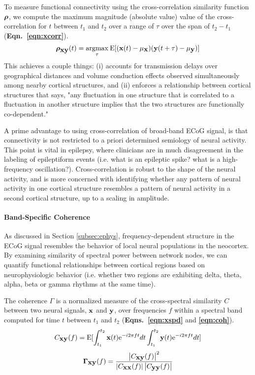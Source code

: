 To measure functional connectivity using the cross-correlation similarity function $\boldsymbol{\displaystyle \rho}$, we compute the maximum magnitude (absolute value) value of the cross-correlation for $t$ between $t_1$ and $t_2$ over a range of $\tau$ over the span of $t_2-t_1$ (\textbf{Eqn.~\ref{eqn:xcorr}}). 
\begin{eqnarray}
    \boldsymbol{\displaystyle \rho}_{\mathbf{\displaystyle xy}}(t) = \underset{\tau}{\operatorname{argmax}}\:{\mathrm{E}}[(\mathbf{\displaystyle x}(t) - \mu_{\mathbf{\displaystyle x}})(\mathbf{\displaystyle y}(t+\tau) - \mu_{\mathbf{\displaystyle y}})]
    \label{eqn:xcorr}
\end{eqnarray}
This achieves a couple things: (i) accounts for transmission delays over geographical distances and volume conduction effects observed simultaneously among nearby cortical structures, and (ii) enforces a relationship between cortical structures that says, "any fluctuation in one structure that is correlated to a fluctuation in another structure implies that the two structures are functionally co-dependent." 

A prime advantage to using cross-correlation of broad-band ECoG signal, is that connectivity is not restricted to a priori determined semiology of neural activity. This point is vital in epilepsy, where clinicians are in much disagreement in the labeling of epileptiform events (i.e. what is an epileptic spike? what is a high-frequency oscillation?). Cross-correlation is robust to the shape of the neural activity, and is more concerned with identifying whether any pattern of neural activity in one cortical structure resembles a pattern of neural activity in a second cortical structure, up to a scaling in amplitude.

\paragraph{Band-Specific Coherence}
As discussed in Section \ref{subsec:ephys}, frequency-dependent structure in the ECoG signal resembles the behavior of local neural populations in the neocortex. By examining similarity of spectral power between network nodes, we can quantify functional relationships between cortical regions based on neurophysiologic behavior (i.e. whether two regions are exhibiting delta, theta, alpha, beta or gamma rhythms at the same time). 

The coherence $\Gamma$ is a normalized measure of the cross-spectral similarity $C$ between two neural signals, $\mathbf{\displaystyle x}$ and $\mathbf{\displaystyle y}$, over frequencies $f$ within a spectral band computed for time $t$ between $t_1$ and $t_2$ (\textbf{Eqns.~\ref{eqn:xspd}} and \textbf{\ref{eqn:coh}}). 
\begin{eqnarray}
    C_{\mathbf{\displaystyle xy}}(f) = {\mathrm{E}}[\int_{t_1}^{t_2}\mathbf{\displaystyle x}(t)\mathrm{e}^{-i 2 \pi ft}dt \int_{t_1}^{t_2}\mathbf{\displaystyle y}(t)\mathrm{e}^{-i 2 \pi ft}dt]
\label{eqn:xspd}
\end{eqnarray}
\begin{eqnarray}
    \boldsymbol{\displaystyle \Gamma}_{\mathbf{\displaystyle xy}}(f) = \frac{\left|{\displaystyle C_{\mathbf{\displaystyle x}\mathbf{\displaystyle y}}(f)}\right|^2}{\left|{\displaystyle C_{\mathbf{\displaystyle x}\mathbf{\displaystyle x}}(f)}\right|\left|{\displaystyle C_{\mathbf{\displaystyle y}\mathbf{\displaystyle y}}(f)}\right|}
\label{eqn:coh}
\end{eqnarray}

